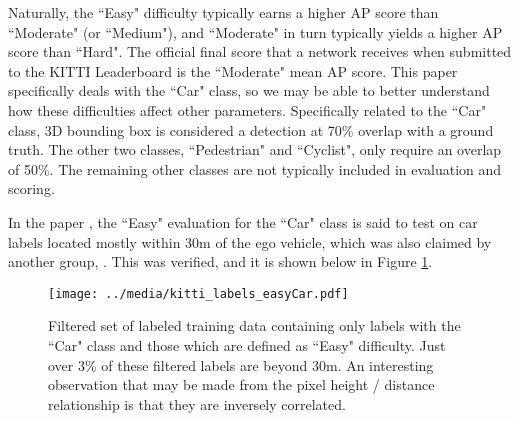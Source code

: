 Naturally, the ``Easy" difficulty typically earns a higher AP score than ``Moderate" (or ``Medium"), and ``Moderate" in turn typically yields a higher AP score than ``Hard". The official final score that a network receives when submitted to the KITTI Leaderboard is the ``Moderate" mean AP score. This paper specifically deals with the ``Car" class, so we may be able to better understand how these difficulties affect other parameters. Specifically related to the ``Car" class, 3D bounding box is considered a detection at 70\% overlap with a ground truth. The other two classes, ``Pedestrian" and ``Cyclist", only require an overlap of 50\%. The remaining other classes are not typically included in evaluation and scoring.

In the paper \cite{wang_pseudo-lidar_2019}, the ``Easy" evaluation for the ``Car" class is said to test on car labels located mostly within 30m of the ego vehicle, which was also claimed by another group, \cite{yang_pixor:_2018}. This was verified, and it is shown below in Figure \ref{kitti_labels_easyCar}.

\begin{figure}[H]
	\centering
	\texttt{[image: ../media/kitti\_labels\_easyCar.pdf]}
	\caption{Filtered set of labeled training data containing only labels with the ``Car" class and those which are defined as ``Easy" difficulty. Just over 3\% of these filtered labels are beyond 30m. An interesting observation that may be made from the pixel height / distance relationship is that they are inversely correlated.}
	\label{kitti_labels_easyCar}
\end{figure}


